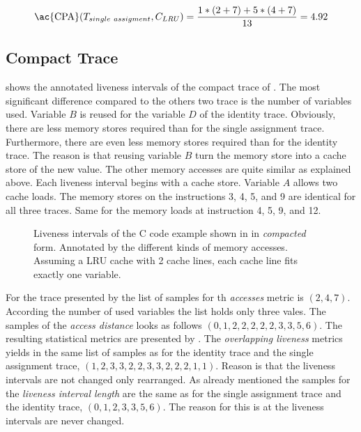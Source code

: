 \documentclass[onecolumn, openright, master, english, signatures]{dbrgrptt}
\begin{document}
\begin{equation}\label{equ:trace-transformation-sa-marked}
\text{\ac{CPA}}(T_{single~assigment}, C_{LRU}) = \frac{1 * (2 + 7) + 5 * (4 + 7)}{13} = 4.92
\end{equation}

\subsection{Compact Trace}
 shows the annotated liveness intervals of the compact trace of . The most significant difference compared to the others two trace is the number of variables used. Variable $B$ is reused for the variable $D$ of the identity \ac{trace}. Obviously, there are less memory stores required than for the single assignment trace. Furthermore, there are even less memory stores required than for the identity \ac{trace}. The reason is that reusing variable $B$ turn the memory store into a cache store of the new value. The other memory accesses are quite similar as explained above. Each liveness interval begins with a cache store. Variable $A$ allows two cache loads. The memory stores on the instructions 3, 4, 5, and 9 are identical for all three traces. Same for the memory loads at instruction 4, 5, 9, and 12.

\begin{figure}
  \centering
  
  \caption{Liveness intervals of the C code example shown in  in \emph{compacted} form. Annotated by the different kinds of memory accesses. Assuming a LRU cache with 2 cache lines, each cache line fits exactly one variable.}
  \label{fig:trace-transformation-compact-marked}
\end{figure}

For the \ac{trace} presented by  the list of samples for th \emph{accesses} metric is $(2, 4, 7)$. According the number of used variables the list holds only three vales. The samples of the \emph{access distance} looks as follows $(0, 1, 2, 2, 2, 2, 2, 3, 3, 5, 6)$. The resulting statistical metrics are presented by . The \emph{overlapping liveness} metrics yields in the same list of samples as for the identity \ac{trace} and the single assignment \ac{trace}, $(1, 2, 3, 3, 2, 2, 3, 3, 2, 2, 2, 1, 1)$. Reason is that the liveness intervals are not changed only rearranged. As already mentioned the samples for the \emph{liveness interval length} are the same as for the single assignment \ac{trace} and the identity \ac{trace}, $(0, 1, 2, 3, 3, 5, 6)$. The reason for this is at the liveness intervals are never changed.
\end{document}
